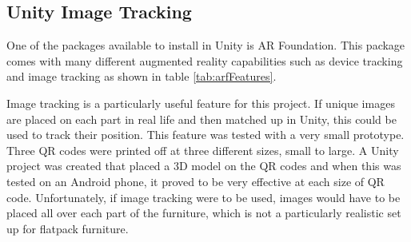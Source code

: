 \documentclass{l4proj}
\begin{document}
\subsection{Unity Image Tracking}

One of the packages available to install in Unity is AR Foundation. This package comes with many different augmented reality capabilities such as device tracking and image tracking as shown in table \ref{tab:arfFeatures}. 

Image tracking is a particularly useful feature for this project. If unique images are placed on each part in real life and then matched up in Unity, this could be used to track their position. This feature was tested with a very small prototype. Three QR codes were printed off at three different sizes, small to large. A Unity project was created that placed a 3D model on the QR codes and when this was tested on an Android phone, it proved to be very effective at each size of QR code. Unfortunately, if image tracking were to be used, images would have to be placed all over each part of the furniture, which is not a particularly realistic set up for flatpack furniture.
\end{document}
